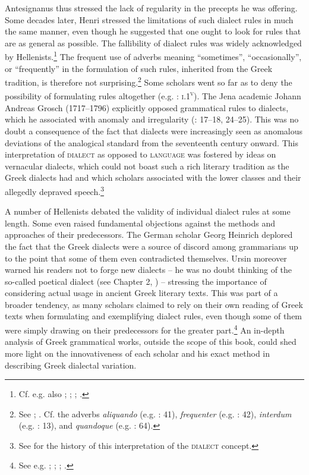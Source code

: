 Antesignanus thus stressed the lack of regularity in the precepts he was offering. Some decades later, Henri \citet[46--47]{Estienne1581} stressed the limitations of such dialect rules in much the same manner, even though he suggested that one ought to look for rules that are as general as possible. The fallibility of dialect rules was widely acknowledged by Hellenists.\footnote{{Cf. e.g. also \citet[38--39]{Schmidt1604}; \citet[2]{Heupel1712}; \citet[1136, 1139]{[frisch]1730}; \citet[299]{Jehne1782}.}} The frequent use of adverbs meaning “sometimes”, “occasionally”, or “frequently” in the formulation of such rules, inherited from the Greek tradition, is therefore not surprising.\footnote{{See \citet[53]{Forstel1999}; \citet[516]{VanRooy2014}. Cf. the adverbs} {\textit{aliquando}} {(e.g. \citealt{Walper1589}: 41),} {\textit{frequenter}} {(e.g. \citealt{Walper1589}: 42),} {\textit{interdum}} {(e.g. \citealt{Antesignanus1554}: 13),}{ }{and} {\textit{quandoque}} {(e.g. \citealt{Walper1589}: 64).}} Some scholars went so far as to deny the possibility of formulating rules altogether (e.g. \citealt{Camden1595}: \textsc{i}.1\textsc{\textsuperscript{v}}). The Jena academic Johann Andreas Grosch (1717–1796) explicitly opposed grammatical rules to dialects, which he associated with anomaly and irregularity (\citealt{Grosch1753}: 17–18, 24–25). This was no doubt a consequence of the fact that dialects were increasingly seen as anomalous deviations of the analogical standard from the seventeenth century onward. This interpretation of \textsc{dialect} as opposed to \textsc{language} was fostered by ideas on vernacular dialects, which could not boast such a rich literary tradition as the Greek dialects had and which scholars associated with the lower classes and their allegedly depraved speech.\footnote{{See \citet[]{VanRooyFcd} for the history of this interpretation of the} {\textsc{dialect}} {concept.}}

A number of Hellenists debated the validity of individual dialect rules at some length. Some even raised fundamental objections against the methods and approaches of their predecessors. The German scholar Georg Heinrich \citet[512]{Ursin1691} deplored the fact that the Greek dialects were a source of discord among grammarians up to the point that some of them even contradicted themselves. Ursin moreover warned his readers not to forge new dialects – he was no doubt thinking of the so-called poetical dialect (see Chapter 2, ) – stressing the importance of considering actual usage in ancient Greek literary texts. This was part of a broader tendency, as many scholars claimed to rely on their own reading of Greek texts when formulating and exemplifying dialect rules, even though some of them were simply drawing on their predecessors for the greater part.\footnote{{See e.g. \citet[†.7\textsc{\textsuperscript{r}}]{Walper1589}; \citet[(.4\textsc{\textsuperscript{r}})]{Portus1603}; \citet[\textsc{\textsuperscript{[a]}}]{Merigon1621}; \citet[b.4\textsc{\textsuperscript{v}}–b.5\textsc{\textsuperscript{r}}, 432]{Nibbe1725}.}}  An in-depth analysis of Greek grammatical works, outside the scope of this book, could shed more light on the innovativeness of each scholar and his exact method in describing Greek dialectal variation.

